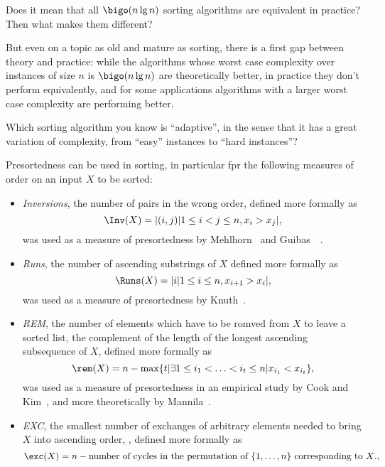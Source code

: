 \begin{interaction}
  Does it mean that all $\bigo(n\lg n)$ sorting algorithms are
  equivalent in practice? Then what makes them different?
\end{interaction}

But even on a topic as old and mature as sorting, there is a first gap
between theory and practice: while the algorithms whose worst case
complexity over instances of size $n$ is $\bigo(n\lg n)$ are
theoretically better, in practice they don't perform equivalently, and
for some applications algorithms with a larger worst case complexity
are performing better.


\begin{interaction}
  Which sorting algorithm you know is ``adaptive'', in the sense that
  it has a great variation of complexity, from ``easy'' instances to
  ``hard instances''?
\end{interaction}


Presortedness can be used in sorting, in particular fpr the following
measures of order on an input $X$ to be sorted:

\begin{itemize}

\item \emph{Inversions}, the number of pairs in the wrong order,
  defined more formally as
$$\Inv(X)=|{(i,j) | 1\leq i<j\leq n, x_i>x_j}|,$$
was used as a measure of presortedness by Mehlhorn~\cite{mehlhorn} and
Guibas~\etal~\cite{guibas}.

\item \emph{Runs}, the number of ascending substrings of $X$
  defined more formally as
  $$\Runs(X)=|{i | 1\leq i\leq n, x_{i+1}>x_i}|,$$
  was used as a measure of presortedness by
  Knuth~\cite{theArtOfComputerProgrammingVol3}.

\item \emph{REM}, the number of elements which have to be romved from
  $X$ to leave a sorted list, the complement of the length of the
  longest ascending subsequence of $X$,
  defined more formally as
  $$\rem(X)= n-\max \{t | \exists 1\leq i_1<\ldots<i_t\leq n | x_{i_1} < x_{i_t} \},$$
  was used as a measure of presortedness in an empirical study by Cook
  and Kim~\cite{cook}, and more theoretically by
  Mannila~\cite{measuresOfPresortednessAndOptimalSortingAlgorithms}.

\item \emph{EXC}, the smallest number of exchanges of arbitrary
  elements needed to bring $X$ into ascending order, ,
  defined more formally as
  $$\exc(X)= n-\mbox{number of cycles in the permutation of $\{1,\ldots,n\}$ corresponding to $X$.},$$

\end{itemize}



